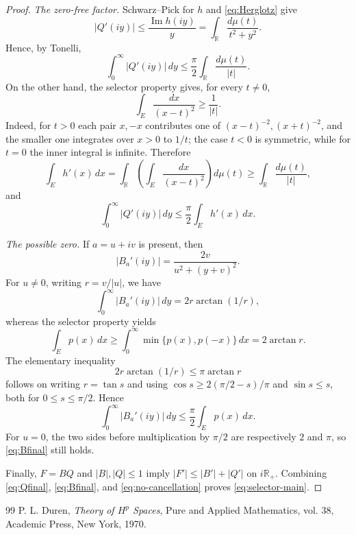 \documentclass[10pt,a4paper]{amsart}
\newcommand{\R}{\mathbb R}
\begin{document}
\begin{proof}
\smallskip
\noindent\emph{The zero-free factor.}
Schwarz--Pick for $h$ and \eqref{eq:Herglotz} give
\[
  |Q'(iy)|
  \le\frac{\operatorname{Im}h(iy)}{y}
  =\int_{\R}\frac{d\mu(t)}{t^2+y^2}.
\]
Hence, by Tonelli,
\begin{equation}\label{eq:Qvertical}
  \int_0^\infty|Q'(iy)|\,dy
  \le\frac\pi2\int_{\R}\frac{d\mu(t)}{|t|}.
\end{equation}
On the other hand, the selector property gives, for every $t\ne0$,
\begin{equation}\label{eq:kernel}
  \int_E\frac{dx}{(x-t)^2}\ge\frac1{|t|}.
\end{equation}
Indeed, for $t>0$ each pair $x,-x$ contributes one of
$(x-t)^{-2},(x+t)^{-2}$, and the smaller one integrates over $x>0$ to $1/t$;
the case $t<0$ is symmetric, while for $t=0$ the inner integral is infinite.
Therefore
\begin{equation}\label{eq:Qestimate}
  \int_Eh'(x)\,dx
  =\int_{\R}\left(\int_E\frac{dx}{(x-t)^2}\right)d\mu(t)
  \ge\int_{\R}\frac{d\mu(t)}{|t|},
\end{equation}
and
\begin{equation}\label{eq:Qfinal}
  \int_0^\infty|Q'(iy)|\,dy
  \le\frac\pi2\int_Eh'(x)\,dx.
\end{equation}

\smallskip
\noindent\emph{The possible zero.}
If $a=u+iv$ is present, then
\[
  |B_a'(iy)|=\frac{2v}{u^2+(y+v)^2}.
\]
For $u\ne0$, writing $r=v/|u|$, we have
\begin{equation}\label{eq:Bvertical}
  \int_0^\infty|B_a'(iy)|\,dy=2r\arctan(1/r),
\end{equation}
whereas the selector property yields
\begin{equation}\label{eq:Bboundary}
  \int_Ep(x)\,dx
  \ge\int_0^\infty\min\{p(x),p(-x)\}\,dx
  =2\arctan r.
\end{equation}
The elementary inequality
\[
  2r\arctan(1/r)\le\pi\arctan r
\]
follows on writing $r=\tan s$ and using
$\cos s\ge2(\pi/2-s)/\pi$ and $\sin s\le s$, both for
$0\leq s \leq \pi/2$. Hence
\begin{equation}\label{eq:Bfinal}
  \int_0^\infty|B_a'(iy)|\,dy
  \le\frac\pi2\int_Ep(x)\,dx.
\end{equation}
For $u=0$, the two sides before multiplication by $\pi/2$ are respectively
$2$ and $\pi$, so \eqref{eq:Bfinal} still holds.

Finally, $F=BQ$ and $|B|,|Q|\le1$ imply $|F'|\le|B'|+|Q'|$ on $i\R_+$.
Combining \eqref{eq:Qfinal}, \eqref{eq:Bfinal}, and
\eqref{eq:no-cancellation} proves \eqref{eq:selector-main}.
\end{proof}

\begin{thebibliography}{99}
 P. L. Duren, \emph{Theory of $H^p$ Spaces}, Pure and Applied Mathematics, vol. 38, Academic Press, New York, 1970.
\end{thebibliography}
\end{document}
